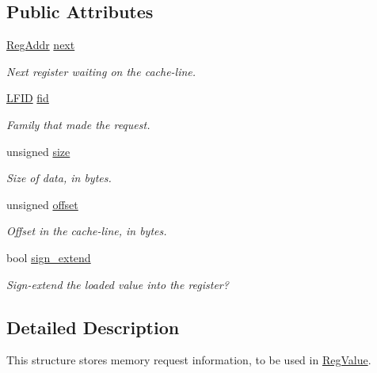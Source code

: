 \subsection*{Public Attributes}
\begin{DoxyCompactItemize}
\item 
\hyperlink{struct_simulator_1_1_reg_addr}{Reg\+Addr} \hyperlink{struct_simulator_1_1_memory_request_a5bd0134cde59df68d78beb8e618d7e3a}{next}
\begin{DoxyCompactList}\small\item\em Next register waiting on the cache-\/line. \end{DoxyCompactList}\item 
\hyperlink{namespace_simulator_aaccbc706b2d6c99085f52f6dfc2333e4}{L\+F\+I\+D} \hyperlink{struct_simulator_1_1_memory_request_a189a15aa31e0b4c18fbc2e26762a1b3e}{fid}
\begin{DoxyCompactList}\small\item\em Family that made the request. \end{DoxyCompactList}\item 
unsigned \hyperlink{struct_simulator_1_1_memory_request_a2bd25f26857936a5a4b7c2080cc51132}{size}
\begin{DoxyCompactList}\small\item\em Size of data, in bytes. \end{DoxyCompactList}\item 
unsigned \hyperlink{struct_simulator_1_1_memory_request_a2db3c5641196ad285fd9d45f74ec16eb}{offset}
\begin{DoxyCompactList}\small\item\em Offset in the cache-\/line, in bytes. \end{DoxyCompactList}\item 
bool \hyperlink{struct_simulator_1_1_memory_request_a555fcb4753e36b18ae39a73d01ea70a5}{sign\+\_\+extend}
\begin{DoxyCompactList}\small\item\em Sign-\/extend the loaded value into the register? \end{DoxyCompactList}\end{DoxyCompactItemize}


\subsection{Detailed Description}
This structure stores memory request information, to be used in \hyperlink{struct_simulator_1_1_reg_value}{Reg\+Value}. 

